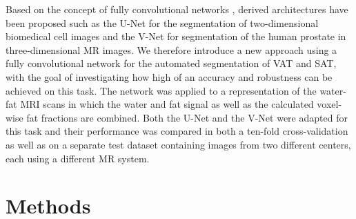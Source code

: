 \documentclass[10pt,letterpaper]{article}
\begin{document}
	\iffalse
	Rather than relying on techniques such as clustering, thresholding and registration, the most successful methods for image-based semantic segmentation on current benchmark datasets in the computer vision community employ machine learning strategies such as convolutional neural networks \cite{everingham2015pascal}, \cite{garcia2017review}, \cite{lecun2015deep}, which have also seen success in medical applications \cite{shen2017deep}. Based on the concept of fully convolutional networks \cite{long2015fully}, derived architectures have been proposed such as the U-Net \cite{ronneberger2015u} for the segmentation of two-dimensional biomedical cell images and the V-Net \cite{milletari2016v} for segmentation of the human prostate in three-dimensional MR images.
	We therefore introduce a new approach using a fully convolutional network for the automated segmentation of VAT and SAT, with the goal of investigating how high of an accuracy and robustness can be achieved on this task. The network was applied to a representation of the water-fat MRI scans in which the water and fat signal as well as the calculated voxel-wise fat fractions are combined. Both the U-Net and the V-Net were adapted for this task and their performance was compared in both a ten-fold cross-validation as well as on a separate test dataset containing images from two different centers, each using a different MR system.
	\fi

	Based on the concept of fully convolutional networks \cite{long2015fully}, derived architectures have been proposed such as the U-Net \cite{ronneberger2015u} for the segmentation of two-dimensional biomedical cell images and the V-Net \cite{milletari2016v} for segmentation of the human prostate in three-dimensional MR images.
	We therefore introduce a new approach using a fully convolutional network for the automated segmentation of VAT and SAT, with the goal of investigating how high of an accuracy and robustness can be achieved on this task. The network was applied to a representation of the water-fat MRI scans in which the water and fat signal as well as the calculated voxel-wise fat fractions are combined. Both the U-Net and the V-Net were adapted for this task and their performance was compared in both a ten-fold cross-validation as well as on a separate test dataset containing images from two different centers, each using a different MR system.




	\section*{Methods}
\end{document}
